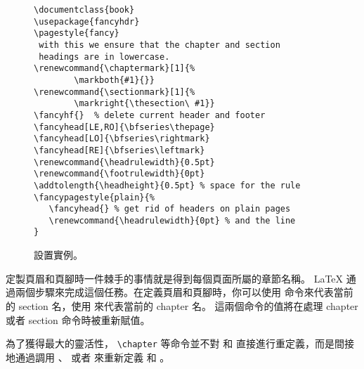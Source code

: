 \begin{figure}[!htbp]
\begin{lined}{\textwidth}
\begin{verbatim}
\documentclass{book}
\usepackage{fancyhdr}
\pagestyle{fancy}
 with this we ensure that the chapter and section
 headings are in lowercase.
\renewcommand{\chaptermark}[1]{%
        \markboth{#1}{}}
\renewcommand{\sectionmark}[1]{%
        \markright{\thesection\ #1}}
\fancyhf{}  % delete current header and footer
\fancyhead[LE,RO]{\bfseries\thepage}
\fancyhead[LO]{\bfseries\rightmark}
\fancyhead[RE]{\bfseries\leftmark}
\renewcommand{\headrulewidth}{0.5pt}
\renewcommand{\footrulewidth}{0pt}
\addtolength{\headheight}{0.5pt} % space for the rule
\fancypagestyle{plain}{%
   \fancyhead{} % get rid of headers on plain pages
   \renewcommand{\headrulewidth}{0pt} % and the line
}
\end{verbatim}
\end{lined}
\caption{ 設置實例。} \label{fancyhdr}
\end{figure}


定製頁眉和頁腳時一件棘手的事情就是得到每個頁面所屬的章節名稱。
\LaTeX{} 通過兩個步驟來完成這個任務。在定義頁眉和頁腳時，你可以使用
  命令來代表當前的 section 名，使用  來代表當前的 chapter 名。
這兩個命令的值將在處理 chapter 或者 section 命令時被重新賦值。


為了獲得最大的靈活性， \verb|\chapter| 等命令並不對  和
  直接進行重定義，而是間接地通過調用 、
 或者  來重新定義  和
 。

